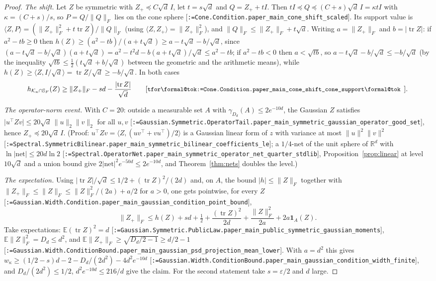 \documentclass[11pt]{article}
\makeatletter
\newcommand{\formal@break}[1]{\@tfor\formal@tok:=#1\do{%
  \formal@tok
  \expandafter\ifx\formal@tok.\allowbreak\else
  \expandafter\ifx\formal@tok\_\allowbreak\fi\fi}}
\DeclareRobustCommand{\formal}[1]{\textnormal{[\texttt{\small\formal@break{#1}}]}}
\newcommand{\R}{\mathbb{R}}
\newcommand{\E}{\mathbb{E}}
\newcommand{\ip}[2]{\langle #1, #2\rangle}
\newcommand{\norm}[1]{\lVert #1\rVert}
\newcommand{\abs}[1]{\lvert #1\rvert}
\newcommand{\tr}{\operatorname{tr}}
\newcommand{\Fro}{F}
\newcommand{\sqd}{\sqrt{d}}
\newcommand{\Id}{I}
\newcommand{\cone}{\mathcal{K}}
\newcommand{\gauss}{\gamma}
\newcommand{\Dd}{D}
\newcommand{\one}{\mathbf{1}}
\theoremstyle{plain}
\theoremstyle{definition}
\makeatother
\begin{document}
\begin{proof}
\emph{The shift.} Let $Z$ be symmetric with $Z_+ \preceq C\sqd\,\Id$, let
$t = s\sqd$ and $Q = Z_+ + t\Id$. Then $t\Id \preceq Q \preceq (C + s)\sqd\,\Id = \kappa t\Id$
with $\kappa = (C+s)/s$, so $P = Q/\norm{Q}_\Fro$ lies on the cone sphere
\formal{Cone.Condition.paper\_main\_cone\_shift\_scaled}. Its support value is
$\ip{Z}{P} = (\norm{Z_+}_\Fro^2 + t\tr Z)/\norm{Q}_\Fro$ (using
$\ip{Z}{Z_+} = \norm{Z_+}_\Fro^2$), and $\norm{Q}_\Fro \le \norm{Z_+}_\Fro + t\sqd$.
Writing $a = \norm{Z_+}_\Fro$ and $b = \abs{\tr Z}$: if $a^2 - tb \ge 0$ then
$h(Z) \ge (a^2 - tb)/(a + t\sqd) \ge a - t\sqd - b/\sqd$, since
$(a - t\sqd - b/\sqd)(a + t\sqd) = a^2 - t^2d - b(a + t\sqd)/\sqd \le a^2 - tb$;
if $a^2 - tb < 0$ then $a < \sqrt{tb}$, so $a - t\sqd - b/\sqd \le -b/\sqd$
(by the inequality $\sqrt{tb} \le \frac12(t\sqd + b/\sqd)$ between the
geometric and the arithmetic means), while
$h(Z) \ge \ip{Z}{\Id/\sqd} = \tr Z/\sqd \ge -b/\sqd$. In both cases
\[
h_{\cone_\kappa\cap\mathbb{S}_\Fro}(Z) \ge \norm{Z_+}_\Fro - s d - \frac{\abs{\tr Z}}{\sqd}
\tag*{\formal{Cone.Condition.paper\_main\_cone\_shift\_cone\_support}.}
\]

\emph{The operator-norm event.} With $C = 20$: outside a measurable set $A$
with $\gauss_{\Dd_d}(A) \le 2e^{-10d}$, the Gaussian $Z$ satisfies
$\abs{u^{\top}Zv} \le 20\sqd\,\norm{u}_2\norm{v}_2$ for all $u, v$
\formal{Gaussian.Symmetric.OperatorTail.paper\_main\_symmetric\_gaussian\_operator\_good\_set},
hence $Z_+ \preceq 20\sqd\,\Id$. (Proof: $u^{\top}Zv = \ip{Z}{(uv^{\top} + vu^{\top})/2}$
is a Gaussian linear form of $z$ with variance at most $\norm{u}^2\norm{v}^2$
\formal{Spectral.SymmetricBilinear.paper\_main\_symmetric\_bilinear\_coefficients\_le};
a $1/4$-net of the unit sphere of $\R^d$ with $\ln\abs{\text{net}} \le 20d\ln 2$
\formal{Spectral.OperatorNet.paper\_main\_symmetric\_operator\_net\_quarter\_stdlib},
Proposition~\ref{prop:linear} at level $10\sqd$ and a union bound give
$2\abs{\text{net}}^2 e^{-50d} \le 2e^{-10d}$, and Theorem~\ref{thm:nets}
doubles the level.)

\emph{The expectation.} Using $\abs{\tr Z}/\sqd \le 1/2 + (\tr Z)^2/(2d)$
and, on $A$, the bound $\abs{h} \le \norm{Z}_\Fro$ together with
$\norm{Z_+}_\Fro \le \norm{Z}_\Fro \le \norm{Z}_\Fro^2/(2a) + a/2$ for $a > 0$,
one gets pointwise, for every $Z$
\formal{Gaussian.Width.Condition.paper\_main\_gaussian\_condition\_point\_bound},
\[
\norm{Z_+}_\Fro \le h(Z) + sd + \tfrac12 + \frac{(\tr Z)^2}{2d} + \frac{\norm{Z}_\Fro^2}{2a} + 2a\one_A(Z).
\]
Take expectations: $\E(\tr Z)^2 = d$ \formal{Gaussian.Symmetric.PublicLaw.paper\_main\_public\_symmetric\_gaussian\_moments},
$\E\norm{Z}_\Fro^2 = \Dd_d \le d^2$, and
$\E\norm{Z_+}_\Fro \ge \sqrt{\Dd_d/2 - 1} \ge d/2 - 1$
\formal{Gaussian.Width.ConditionBound.paper\_main\_gaussian\_psd\_projection\_mean\_lower}.
With $a = d^2$ this gives
$w_\kappa \ge (1/2 - s)d - 2 - \Dd_d/(2d^2) - 4d^2 e^{-10d}$
\formal{Gaussian.Width.ConditionBound.paper\_main\_gaussian\_condition\_width\_finite},
and $\Dd_d/(2d^2) \le 1/2$, $d^2e^{-10d} \le 216/d$ give the claim. For the
second statement take $s = \varepsilon/2$ and $d$ large.
\end{proof}
\end{document}
